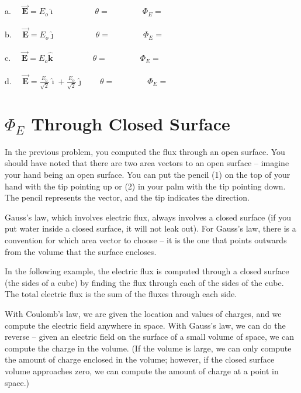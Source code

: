 \documentclass{article}
\newcommand{\ds}[0]{\displaystyle}
\newcommand{\ihat}[0]{\hat{\boldsymbol{\imath}}}
\newcommand{\jhat}[0]{\hat{\boldsymbol{\jmath}}}
\newcommand{\khat}[0]{\hat{\boldsymbol{k}}}
\newcommand{\bfvec}[1]{\vec{\mathbf{#1}}}
\begin{document}


a. $\quad\ds\bfvec{E}=E_o\ihat\qquad\phantom{+\frac{E_o}{\sqrt{2}}\jhat}\theta=\qquad\qquad\Phi_E=$

b. $\quad\ds\bfvec{E}=E_o\jhat\qquad\phantom{+ \frac{E_o}{\sqrt{2}}\jhat}\theta=\qquad\qquad\Phi_E=$ 

c. $\quad\ds\bfvec{E}=E_o\khat\qquad\phantom{+\frac{E_o}{\sqrt{2}}\jhat}\theta=\qquad\qquad\Phi_E=$ 

d. $\quad\ds\bfvec{E}=\frac{E_o}{\sqrt{2}}\ihat + \frac{E_o}{\sqrt{2}}\jhat\qquad\theta=\qquad\qquad\Phi_E=$
\fi

\section{$\Phi_E$ Through Closed Surface}

In the previous problem, you computed the flux through an open surface. You should have noted that there are two area vectors to an open surface -- imagine your hand being an open surface. You can put the pencil (1) on the top of your hand with the tip pointing up or (2) in your palm with the tip pointing down. The pencil represents the vector, and the tip indicates the direction.

Gauss's law, which involves electric flux, always involves a closed surface (if you put water inside a closed surface, it will not leak out). For Gauss's law, there is a convention for which area vector to choose -- it is the one that points outwards from the volume that the surface encloses. 

In the following example, the electric flux is computed through a closed surface (the sides of a cube) by finding the flux through each of the sides of the cube. The total electric flux is the sum of the fluxes through each side.


With Coulomb's law, we are given the location and values of charges, and we compute the electric field anywhere in space. With Gauss's law, we can do the reverse -- given an electric field on the surface of a small volume of space, we can compute the charge in the volume. (If the volume is large, we can only compute the amount of charge enclosed in the volume; however, if the closed surface volume approaches zero, we can compute the amount of charge at a point in space.)
\end{document}
